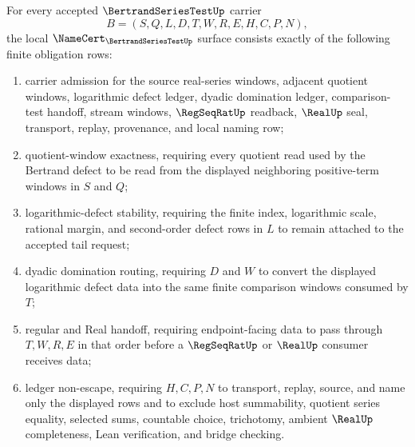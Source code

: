 \begin{theorem}\label{thm:bertrand-series-test-namecert-obligations}
For every accepted $\BertrandSeriesTestUp$ carrier
$$
B=(S,Q,L,D,T,W,R,E,H,C,P,N),
$$
the local $\NameCert_{\BertrandSeriesTestUp}$ surface consists exactly of the following finite obligation rows:
\begin{enumerate}
\item carrier admission for the source real-series windows, adjacent quotient windows, logarithmic defect ledger, dyadic domination ledger, comparison-test handoff, stream windows, $\RegSeqRatUp$ readback, $\RealUp$ seal, transport, replay, provenance, and local naming row;
\item quotient-window exactness, requiring every quotient read used by the Bertrand defect to be read from the displayed neighboring positive-term windows in $S$ and $Q$;
\item logarithmic-defect stability, requiring the finite index, logarithmic scale, rational margin, and second-order defect rows in $L$ to remain attached to the accepted tail request;
\item dyadic domination routing, requiring $D$ and $W$ to convert the displayed logarithmic defect data into the same finite comparison windows consumed by $T$;
\item regular and Real handoff, requiring endpoint-facing data to pass through $T,W,R,E$ in that order before a $\RegSeqRatUp$ or $\RealUp$ consumer receives data;
\item ledger non-escape, requiring $H,C,P,N$ to transport, replay, source, and name only the displayed rows and to exclude host summability, quotient series equality, selected sums, countable choice, trichotomy, ambient $\RealUp$ completeness, Lean verification, and bridge checking.
\end{enumerate}
\end{theorem}
